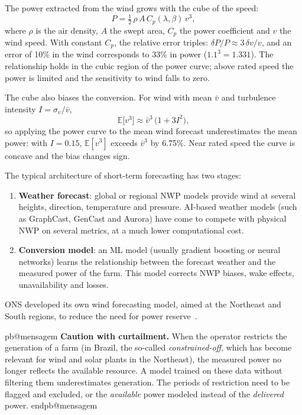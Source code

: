 \documentclass[10pt,a4paper,oneside]{article}
\makeatletter
\renewenvironment{nota}{\csname pb@mensagem\endcsname{NOTE}{sinalnota}{white}}{\csname endpb@mensagem\endcsname}
\makeatother
\begin{document}
The power extracted from the wind grows with the cube of the speed:
\begin{equation}
  P = \tfrac{1}{2}\,\rho\, A\, C_p(\lambda, \beta)\, v^3,
\end{equation}
where $\rho$ is the air density, $A$ the swept area, $C_p$ the power
coefficient and $v$ the wind speed. With constant $C_p$, the relative error
triples: $\delta P / P \approx 3\,\delta v / v$, and an error of 10\% in the
wind corresponds to 33\% in power ($1.1^3 = 1.331$). The relationship holds
in the cubic region of the power curve; above rated speed the power is
limited and the sensitivity to wind falls to zero.

The cube also biases the conversion. For wind with mean $\bar{v}$ and
turbulence intensity $I = \sigma_v / \bar{v}$,
\begin{equation}
  \mathbb{E}\big[v^3\big] \approx \bar{v}^3\,\big(1 + 3I^2\big),
\end{equation}
so applying the power curve to the mean wind forecast underestimates the mean
power: with $I = 0.15$, $\mathbb{E}[v^3]$ exceeds $\bar{v}^3$ by 6.75\%. Near
rated speed the curve is concave and the bias changes sign.

The typical architecture of short-term forecasting has two stages:
\begin{enumerate}
  \item \textbf{Weather forecast}: global or regional NWP models provide wind
    at several heights, direction, temperature and pressure. AI-based weather
    models (such as GraphCast, GenCast and Aurora) have come to compete with
    physical NWP on several metrics, at a much lower computational cost.
  \item \textbf{Conversion model}: an ML model (usually gradient boosting or
    neural networks) learns the relationship between the forecast weather
    and the measured power of the farm. This model corrects NWP biases, wake
    effects, unavailability and losses.
\end{enumerate}

ONS developed its own wind forecasting model, aimed at the Northeast and
South regions, to reduce the need for power reserve~\cite{onseolico}.

\begin{nota}
\textbf{Caution with curtailment.} When the operator restricts the generation
of a farm (in Brazil, the so-called \textit{constrained-off}, which has
become relevant for wind and solar plants in the Northeast), the measured
power no longer reflects the available resource. A model trained on these
data without filtering them underestimates generation. The periods of
restriction need to be flagged and excluded, or the \emph{available} power
modeled instead of the \emph{delivered} power.
\end{nota}
\end{document}
